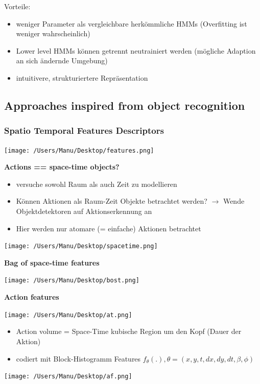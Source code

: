 \documentclass[paper=a4, fontsize=11pt]{scrartcl} %
\numberwithin{equation}{section} %
\numberwithin{figure}{section} %
\numberwithin{table}{section} %
\begin{document}
Vorteile:
\begin{itemize}
\item weniger Parameter als vergleichbare herkömmliche HMMs (Overfitting ist weniger wahrscheinlich)
\item Lower level HMMs können getrennt neutrainiert werden (mögliche Adaption an sich ändernde Umgebung)
\item intuitivere, strukturiertere Repräsentation
\end{itemize}

\subsection{Approaches inspired from object recognition }

\subsubsection{Spatio Temporal Features Descriptors}

\texttt{[image: /Users/Manu/Desktop/features.png]}

\textbf{Actions == space-time objects?}

\begin{itemize}
\item versuche sowohl Raum als auch Zeit zu modellieren
\item Können Aktionen als Raum-Zeit Objekte betrachtet werden? $\rightarrow$ Wende Objektdetektoren auf Aktionserkennung an
\item Hier werden nur atomare (= einfache) Aktionen betrachtet
\end{itemize}

\texttt{[image: /Users/Manu/Desktop/spacetime.png]}

\textbf{Bag of space-time features}

\texttt{[image: /Users/Manu/Desktop/bost.png]}

\textbf{Action features}

\texttt{[image: /Users/Manu/Desktop/at.png]}

\begin{itemize}
\item Action volume = Space-Time kubische Region um den Kopf (Dauer der Aktion)
\item codiert mit Block-Histogramm Features $f_\theta(.), \theta = (x,y,t,dx,dy,dt,\beta,\phi)$
\end{itemize}

\texttt{[image: /Users/Manu/Desktop/af.png]}
\end{document}
